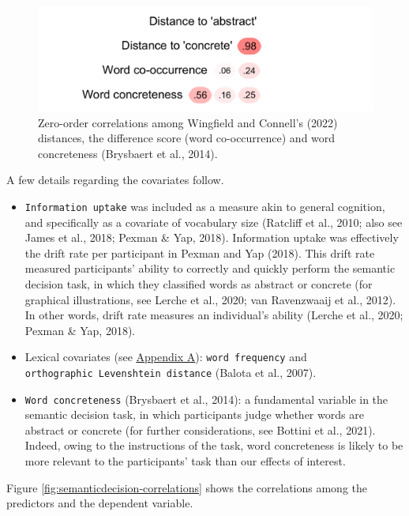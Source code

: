 \documentclass[
  12pt,
  man,floatsintext]{apa7}
\begin{document}
\begin{figure}

{\centering \includegraphics[width=0.63\linewidth]{thesis-core_files/figure-latex/semanticdecision-cooccurrence-correlations-1} 

}

\caption{Zero-order correlations among Wingfield and Connell's (2022) distances, the difference score (word co-occurrence) and word concreteness (Brysbaert et al., 2014).}\label{fig:semanticdecision-cooccurrence-correlations}
\end{figure}

A few details regarding the covariates follow.

\begin{itemize}
\item
  \texttt{Information\ uptake} was included as a measure akin to general cognition, and specifically as a covariate of vocabulary size (Ratcliff et al., 2010; also see James et al., 2018; Pexman \& Yap, 2018). Information uptake was effectively the drift rate per participant in Pexman and Yap (2018). This drift rate measured participants' ability to correctly and quickly perform the semantic decision task, in which they classified words as abstract or concrete (for graphical illustrations, see Lerche et al., 2020; van Ravenzwaaij et al., 2012). In other words, drift rate measures an individual's ability (Lerche et al., 2020; Pexman \& Yap, 2018).
\item
  Lexical covariates (see \protect\hyperlink{appendix-A-lexical-covariates}{\underline{Appendix A}}): \texttt{word\ frequency} and \texttt{orthographic\ Levenshtein\ distance} (Balota et al., 2007).
\item
  \texttt{Word\ concreteness} (Brysbaert et al., 2014): a fundamental variable in the semantic decision task, in which participants judge whether words are abstract or concrete (for further considerations, see Bottini et al., 2021). Indeed, owing to the instructions of the task, word concreteness is likely to be more relevant to the participants' task than our effects of interest.
\end{itemize}

Figure \ref{fig:semanticdecision-correlations} shows the correlations among the predictors and the dependent variable.
\end{document}
